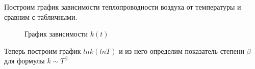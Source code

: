 \documentclass[a4paper, 12pt]{article}
\begin{document}
            Построим график зависимости теплопроводности воздуха от температуры и сравним с табличными.

            \begin{figure}[ht]
                \caption{График зависимости $k(t)$}
                \label{k_graph}
            \end{figure}

            Теперь построим график $ln k (lnT)$ и из него определим показатель степени $\beta$ для формулы $k \sim T^{\beta}$
\end{document}
